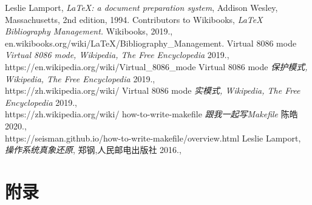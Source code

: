 \documentclass[a4paper, 11pt]{article} %
\begin{document}
\begin{thebibliography}{99}
  
  Leslie Lamport,
  \textit{\LaTeX: a document preparation system},
  Addison Wesley, Massachusetts,
  2nd edition,
  1994.
  Contributors to Wikibooks,
  \textit{LaTeX Bibliography Management.}
  Wikibooks,
  2019., \\
  en.wikibooks.org/wiki/LaTeX/Bibliography\_Management.
  Virtual 8086 mode
  \textit{Virtual 8086 mode, Wikipedia, The Free Encyclopedia}
  2019., \\
  https://en.wikipedia.org/wiki/Virtual\_8086\_mode
  Virtual 8086 mode
  \textit{保护模式, Wikipedia, The Free Encyclopedia}
  2019., \\
  https://zh.wikipedia.org/wiki/%
  Virtual 8086 mode
  \textit{实模式, Wikipedia, The Free Encyclopedia}
  2019., \\
  https://zh.wikipedia.org/wiki/%
  how-to-write-makefile
  \textit{跟我一起写Makefile}
  陈皓
  2020., \\
  https://seisman.github.io/how-to-write-makefile/overview.html
  Leslie Lamport,
  \textit{操作系统真象还原},
  郑钢,人民邮电出版社
  2016., \\
 
\end{thebibliography}

\section{附录}
\FloatBarrier
\end{document}

